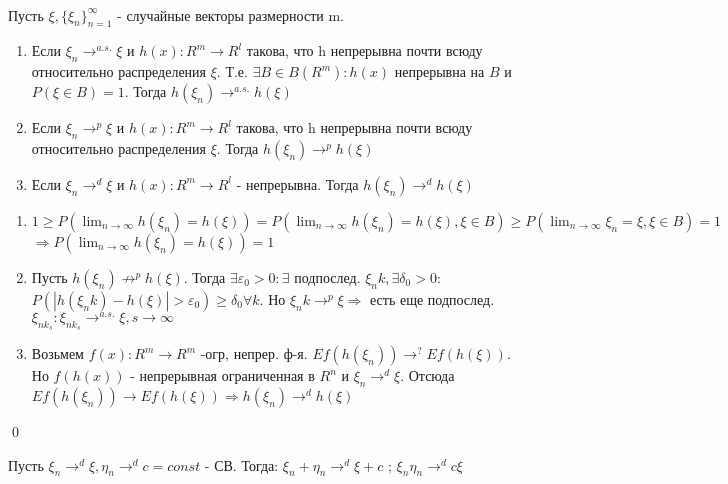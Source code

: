 	\begin{theorem}[<о наследовании сх-ти>]\\
	Пусть $\xi, \{\xi_n\}_{n=1}^\infty$ - случайные векторы размерности m.
	\begin{enumerate}
		\item Если $\xi_n \to^{a.s.} \xi$ и $h(x):R^m \to R^l$ такова, что h непрерывна почти всюду относительно распределения $\xi$.
		Т.е. $\exists B \in B(R^m): h(x)$ непрерывна на $B$ и $P(\xi \in B) = 1$. Тогда $h(\xi_n) \to^{a.s.} h(\xi)$
		\item Если $\xi_n \to^{p} \xi$ и $h(x):R^m \to R^l$ такова, что h непрерывна почти всюду относительно распределения $\xi$. 
		Тогда $h(\xi_n) \to^{p} h(\xi)$
		\item Если $\xi_n \to^{d} \xi$ и $h(x):R^m \to R^l$ - непрерывна. Тогда $h(\xi_n) \to^{d} h(\xi)$
	\end{enumerate}
	\proof
	\begin{enumerate}
		\item $1 \ge P(\lim_{n\to\infty}h(\xi_n)=h(\xi)) = P(\lim_{n\to\infty}h(\xi_n)=h(\xi), \xi \in B) \ge P(\lim_{n\to\infty}\xi_n=\xi, \xi \in B) = 1$
		$\Rightarrow P(\lim_{n\to\infty}h(\xi_n)=h(\xi)) = 1$
		\item Пусть $h(\xi_n) \not\to^p h(\xi)$. Тогда $\exists \varepsilon_0 > 0: \exists$ подпослед. $\xi_nk, \exists \delta_0  > 0:$
		$P(|h(\xi_nk) - h(\xi)| > \varepsilon_0) \ge \delta_0 \forall k$.
		Но $\xi_nk \to^p \xi \Rightarrow$ есть еще подпослед. $\xi_{nk_s}: \xi_{nk_s} \to^{a.s.} \xi, s \to \infty$
		\item Возьмем $f(x):R^m \to R^m$ -огр, непрер. ф-я. $Ef(h(\xi_n))\to^? Ef(h(\xi)) $.
		Но $f(h(x))$ - непрерывная ограниченная в $R^n$ и $\xi_n\to^d\xi$. Отсюда $Ef(h(\xi_n)) \to Ef(h(\xi)) \Rightarrow h(\xi_n) \to^d h(\xi)$
	\end{enumerate}
	\qed
	\end{theorem}
	
	\begin{lemma}[<Слуцкого>]
		Пусть $\xi_n \to^d \xi, \eta_n \to^d c = const$ - СВ. Тогда: $\xi_n + \eta_n \to^d \xi + c$ ; $\xi_n\eta_n \to^d c\xi $
	\end{lemma}